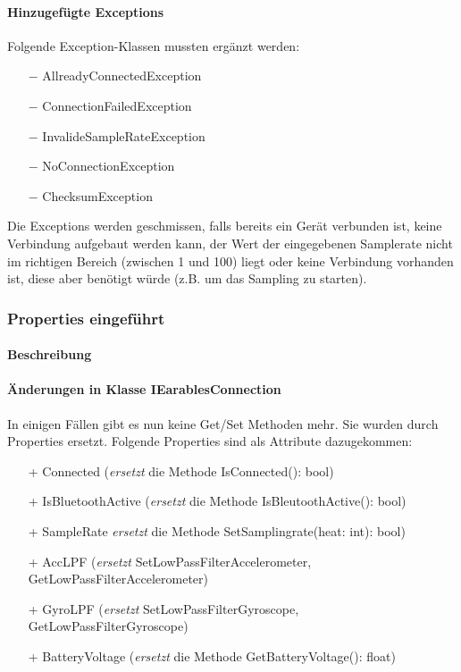 \documentclass[a4paper,12pt]{article}
\begin{document}
\paragraph{Hinzugefügte Exceptions}
Folgende Exception-Klassen mussten ergänzt werden:
\begin{itemize}
	\item[$-$] AllreadyConnectedException
	\item[$-$] ConnectionFailedException
	\item[$-$] InvalideSampleRateException
	\item[$-$] NoConnectionException
	\item[$-$] ChecksumException %
\end{itemize}
Die Exceptions werden geschmissen, falls bereits ein Gerät verbunden ist, keine Verbindung aufgebaut werden kann, der Wert der eingegebenen Samplerate nicht im richtigen Bereich (zwischen 1 und 100) liegt oder keine Verbindung vorhanden ist, diese aber benötigt würde (z.B. um das Sampling zu starten).

\subsubsection{Properties eingeführt}
\paragraph{Beschreibung}
\paragraph{Änderungen in Klasse IEarablesConnection}
In einigen Fällen gibt es nun keine Get/Set Methoden mehr. Sie wurden durch Properties ersetzt.
Folgende Properties sind als Attribute dazugekommen:
\begin{itemize}
	\item[+] Connected (\textit{ersetzt } die Methode IsConnected(): bool)
	\item[+] IsBluetoothActive  (\textit{ersetzt } die Methode IsBleutoothActive(): bool)
	\item[+] SampleRate  \textit{ersetzt } die Methode SetSamplingrate(heat: int): bool)
	\item[+] AccLPF  (\textit{ersetzt} SetLowPassFilterAccelerometer, GetLowPassFilterAccelerometer)
	\item[+] GyroLPF  (\textit{ersetzt} SetLowPassFilterGyroscope, GetLowPassFilterGyroscope)
	\item[+] BatteryVoltage  (\textit{ersetzt } die Methode GetBatteryVoltage(): float)
\end{itemize}
\end{document}
